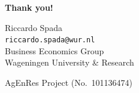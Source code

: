 \documentclass[aspectratio=169,12pt]{beamer}
\begin{document}
\begin{frame}{}
\centering
\vspace{2cm}
{\Large \textbf{Thank you!}}

\vspace{1.5cm}
Riccardo Spada \\
\texttt{riccardo.spada@wur.nl} \\
\vspace{0.5em}
Business Economics Group \\
Wageningen University \& Research

\vspace{1em}
\small AgEnRes Project (No.\ 101136474)
\end{frame}
\end{document}
